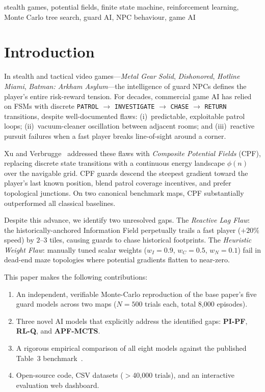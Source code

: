 \documentclass[conference,onecolumn]{IEEEtran}
\begin{document}
\begin{IEEEkeywords}
stealth games, potential fields, finite state machine, reinforcement
learning, Monte Carlo tree search, guard AI, NPC behaviour, game AI
\end{IEEEkeywords}

\section{Introduction}

In stealth and tactical video games---\emph{Metal Gear Solid},
\emph{Dishonored}, \emph{Hotline Miami}, \emph{Batman: Arkham
Asylum}---the intelligence of guard NPCs defines the player's entire
risk-reward tension. For decades, commercial game AI has relied on
FSMs with discrete \texttt{PATROL} $\to$ \texttt{INVESTIGATE} $\to$
\texttt{CHASE} $\to$ \texttt{RETURN} transitions, despite
well-documented flaws: (i)~predictable, exploitable patrol loops;
(ii)~vacuum-cleaner oscillation between adjacent rooms; and
(iii)~reactive pursuit failures when a fast player breaks line-of-sight
around a corner.

Xu and Verbrugge~\cite{xu2025} addressed these flaws with
\emph{Composite Potential Fields} (CPF), replacing discrete state
transitions with a continuous energy landscape $\phi(n)$ over the
navigable grid. CPF guards descend the steepest gradient toward the
player's last known position, blend patrol coverage incentives, and
prefer topological junctions. On two canonical benchmark maps, CPF
substantially outperformed all classical baselines.

Despite this advance, we identify two unresolved gaps. The
\emph{Reactive Lag Flaw}: the historically-anchored Information Field
perpetually trails a fast player ($+20\%$ speed) by $2$--$3$ tiles,
causing guards to chase historical footprints. The
\emph{Heuristic Weight Flaw}: manually tuned scalar weights
($w_I{=}0.9$, $w_C{=}0.5$, $w_N{=}0.1$) fail in dead-end maze
topologies where potential gradients flatten to near-zero.

This paper makes the following contributions:
\begin{enumerate}
  \item An independent, verifiable Monte-Carlo reproduction of the
        base paper's five guard models across two maps
        ($N{=}500$ trials each, total 8,000 episodes).
  \item Three novel AI models that explicitly address the identified
        gaps: \textbf{PI-PF}, \textbf{RL-Q}, and \textbf{APF-MCTS}.
  \item A rigorous empirical comparison of all eight models against
        the published Table~3 benchmark~\cite{xu2025}.
  \item Open-source code, CSV datasets ($>$40,000 trials),
        and an interactive evaluation web dashboard.
\end{enumerate}
\end{document}
